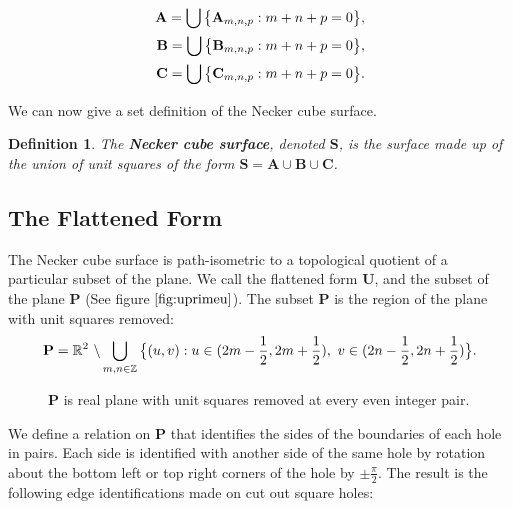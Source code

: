 \documentclass[]{article}
\newtheorem{Def}{Definition}[subsection]
\begin{document}
\begin{align*}
\mathbf{A}=\bigcup\big{\{}\mathbf{A}_{m,n,p}: m+n+p=0\big{\}},
\\\mathbf{B}=\bigcup\big{\{}\mathbf{B}_{m,n,p}: m+n+p=0\big{\}},
\\\mathbf{C}=\bigcup\big{\{}\mathbf{C}_{m,n,p}: m+n+p=0\big{\}}.
\end{align*}

\noindent We can now give a set definition of the Necker cube surface.

\begin{Def} The \textbf{Necker cube surface}, denoted $\mathbf{S}$, is the surface made up of the union of unit squares of the form $\mathbf{S} = \mathbf{A}\cup\mathbf{B}\cup\mathbf{C}$.\end{Def}

\subsection{The Flattened Form}
The Necker cube surface is path-isometric to a topological quotient of a particular subset of the plane. We call the flattened form $\mathbf{U}$, and the subset of the plane $\mathbf P$ (See figure $\ref{fig:uprimeu}$).
The subset $\mathbf P$ is the region of the plane with unit squares removed:
\begin{equation}
\label{eq:P}
\mathbf{P} = \mathbb{R}^{2}\text{ }\backslash\bigcup_{m,n \in {\mathbb Z}} \big{\{}(u,v):u\in(2m-\frac{1}{2},2m+\frac{1}{2}),\text{ } v\in(2n-\frac{1}{2},2n+\frac{1}{2})\big{\}}.
\end{equation}

\begin{figure}[H]
\begin{center}

\end{center}
\caption{$\mathbf P$ is real plane with unit squares removed at every even integer pair.}
\label{fig:uprimeu}
\end{figure}

\noindent We define a relation on $\mathbf P$ that identifies the sides of the boundaries of each hole in pairs. Each side is identified with another side of the same hole by rotation about the bottom left or top right corners of the hole by $\pm\frac{\pi}{2}$. The result is the following edge identifications made on cut out square holes: 

\begin{figure}[H]\centering

\end{figure}
\end{document}
